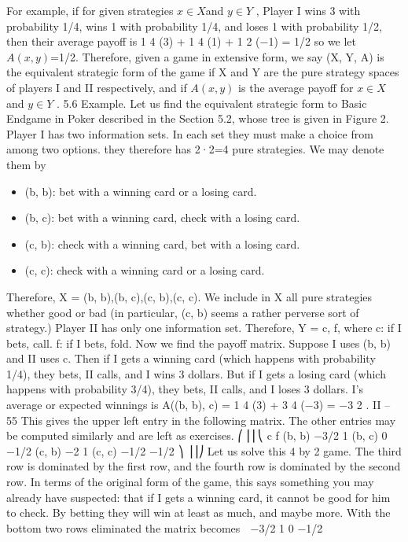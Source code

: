 \begin{framed}
For example, if for given strategies $x \in X $and $y \in Y $ , Player I wins 3 with probability
1/4, wins 1 with probability 1/4, and loses 1 with probability 1/2, then their average payoff
is 1
4 (3) + 1
4 (1) + 1
2 (−1) = 1/2 so we let $A(x, y)$=1/2.
Therefore, given a game in extensive form, we say (X, Y, A) is the equivalent strategic
form of the game if X and Y are the pure strategy spaces of players I and II respectively,
and if $A(x, y)$ is the average payoff for $x \in X $and $y \in Y $ .
5.6 Example. Let us find the equivalent strategic form to Basic Endgame in Poker
described in the Section 5.2, whose tree is given in Figure 2. Player I has two information
sets. In each set they must make a choice from among two options. they therefore has 2·2=4
pure strategies. We may denote them by
\begin{itemize}
\item (b, b): bet with a winning card or a losing card.
\item (b, c): bet with a winning card, check with a losing card.
\item (c, b): check with a winning card, bet with a losing card.
\item (c, c): check with a winning card or a losing card.
\end{itemize}
Therefore, X = {(b, b),(b, c),(c, b),(c, c)}. We include in X all pure strategies whether
good or bad (in particular, (c, b) seems a rather perverse sort of strategy.)
Player II has only one information set. Therefore, Y = {c, f}, where
c: if I bets, call.
f: if I bets, fold.
Now we find the payoff matrix. Suppose I uses (b, b) and II uses c. Then if I gets a
winning card (which happens with probability 1/4), they bets, II calls, and I wins 3 dollars.
But if I gets a losing card (which happens with probability 3/4), they bets, II calls, and I
loses 3 dollars. I’s average or expected winnings is
A((b, b), c) = 1
4
(3) + 3
4
(−3) = −3
2
.
II – 55
This gives the upper left entry in the following matrix. The other entries may be computed
similarly and are left as exercises.
⎛
⎜⎜⎝
c f
(b, b) −3/2 1
(b, c) 0 −1/2
(c, b) −2 1
(c, c) −1/2 −1/2
⎞
⎟⎟⎠
Let us solve this 4 by 2 game. The third row is dominated by the first row, and the
fourth row is dominated by the second row. In terms of the original form of the game, this
says something you may already have suspected: that if I gets a winning card, it cannot
be good for him to check. By betting they will win at least as much, and maybe more. With
the bottom two rows eliminated the matrix becomes  −3/2 1
0 −1/2


\end{framed}
